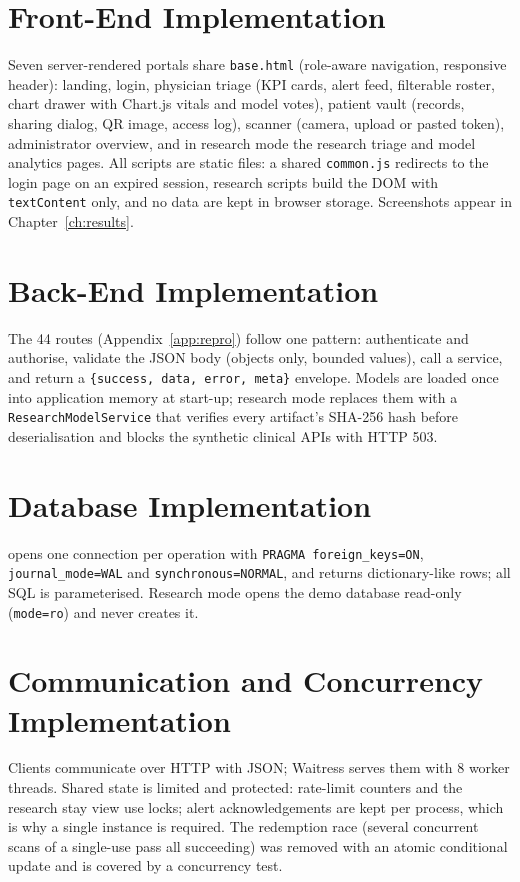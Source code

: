 \section{Front-End Implementation}
Seven server-rendered portals share \texttt{base.html} (role-aware navigation, responsive header):
landing, login, physician triage (KPI cards, alert feed, filterable roster, chart drawer with Chart.js
vitals and model votes), patient vault (records, sharing dialog, QR image, access log), scanner (camera,
upload or pasted token), administrator overview, and in research mode the research triage and model
analytics pages. All scripts are static files: a shared \texttt{common.js} redirects to the login page on
an expired session, research scripts build the DOM with \texttt{textContent} only, and no data are kept in
browser storage. Screenshots appear in Chapter~\ref{ch:results}.

\section{Back-End Implementation}
The 44 routes (Appendix~\ref{app:repro}) follow one pattern: authenticate and authorise, validate the
JSON body (objects only, bounded values), call a service, and return a \texttt{\{success, data, error,
meta\}} envelope. Models are loaded once into application memory at start-up; research mode replaces them
with a \texttt{ResearchModelService} that verifies every artifact's SHA-256 hash before deserialisation
and blocks the synthetic clinical APIs with HTTP 503.

\section{Database Implementation}
 opens one connection per operation with \texttt{PRAGMA foreign\_keys=ON},
\texttt{journal\_mode=WAL} and \texttt{synchronous=NORMAL}, and returns dictionary-like rows; all SQL is
parameterised. Research mode opens the demo database read-only (\texttt{mode=ro}) and never creates it.

\section{Communication and Concurrency Implementation}
Clients communicate over HTTP with JSON; Waitress serves them with 8 worker threads. Shared state is
limited and protected: rate-limit counters and the research stay view use locks; alert acknowledgements are
kept per process, which is why a single instance is required. The redemption race (several concurrent
scans of a single-use pass all succeeding) was removed with an atomic conditional update and is covered by
a concurrency test.

